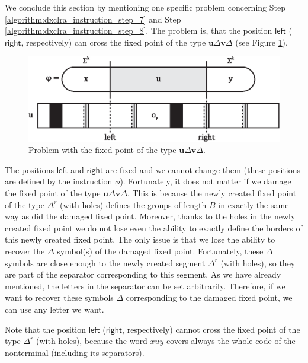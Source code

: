We conclude this section by mentioning one specific problem concerning Step \ref{algorithm:dxclra_instruction_step_7} and Step \ref{algorithm:dxclra_instruction_step_8}. The problem is, that the position $\textsf{left}$ ($\textsf{right}$, respectively) can cross the fixed point of the type $\mathbf{u} \Delta \mathbf{v} \Delta$ (see Figure \ref{figure:delete_issue}).

\begin{figure}[htp]
\centering
\includegraphics[scale=1.0]{img/delete_issue.eps}
\caption[Problem with the fixed point of the type $\mathbf{u} \Delta \mathbf{v} \Delta$.]
{Problem with the fixed point of the type $\mathbf{u} \Delta \mathbf{v} \Delta$.}
\label{figure:delete_issue}
\end{figure}

The positions $\textsf{left}$ and $\textsf{right}$ are fixed and we cannot change them (these positions are defined by the instruction $\phi$). Fortunately, it does not matter if we damage the fixed point of the type $\mathbf{u} \Delta \mathbf{v} \Delta$. This is because the newly created fixed point of the type $\Delta^r$ (with holes) defines the groups of length $B$ in exactly the same way as did the damaged fixed point. Moreover, thanks to the holes in the newly created fixed point we do not lose even the ability to exactly define the borders of this newly created fixed point. The only issue is that we lose the ability to recover the $\Delta$ symbol(s) of the damaged fixed point. Fortunately, these $\Delta$ symbols are close enough to the newly created segment $\Delta^r$ (with holes), so they are part of the separator corresponding to this segment. As we have already mentioned, the letters in the separator can be set arbitrarily. Therefore, if we want to recover these symbols $\Delta$ corresponding to the damaged fixed point, we can use any letter we want.

Note that the position $\textsf{left}$ ($\textsf{right}$, respectively) cannot cross the fixed point of the type $\Delta^r$ (with holes), because  the word $xuy$ covers always the whole code of the nonterminal  (including its separators).


